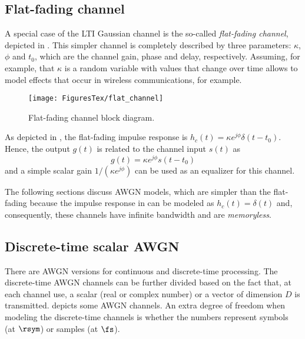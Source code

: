 \subsection{Flat-fading channel}

A special case of the LTI Gaussian channel is the so-called \emph{flat-fading channel}, depicted in . This simpler channel is completely described by three parameters: $\kappa$, $\phi$ and $t_0$, which are the channel gain, phase and delay, respectively. Assuming, for example, that $\kappa$ is a random variable with values that change over time allows to model effects that occur in wireless communications, for example.

\begin{figure}[htbp]
\centering
\texttt{[image: FiguresTex/flat\_channel]}
\caption{Flat-fading channel block diagram.\label{fig:flat_channel}}
\end{figure}

As depicted in , the flat-fading impulse response is $h_c(t)=\kappa e^{j \phi} \delta(t-t_0)$. Hence, the output $g(t)$ is related to the channel input $s(t)$ as
\begin{equation}
g(t) = \kappa e^{j \phi} s(t-t_0)
\label{eq:flatFadingOutput}
\end{equation}
and a simple scalar gain $1/(\kappa e^{j \phi})$ can be used as an equalizer for this channel.

The following sections discuss AWGN models, which are simpler than the flat-fading because the impulse response in  can be modeled as $h_c(t) = \delta(t)$ and, consequently, these channels have infinite bandwidth and are \emph{memoryless}.

\subsection{Discrete-time scalar AWGN}

There are AWGN versions for continuous and discrete-time processing.
The discrete-time AWGN channels can be further divided based on the fact that, at each channel use, a scalar (real or complex number) or a vector of dimension $D$ is transmitted. 
 depicts some AWGN channels. An extra degree of freedom when modeling
the discrete-time channels is whether the numbers represent symbols (at $\rsym$) or samples (at $\fs$).


